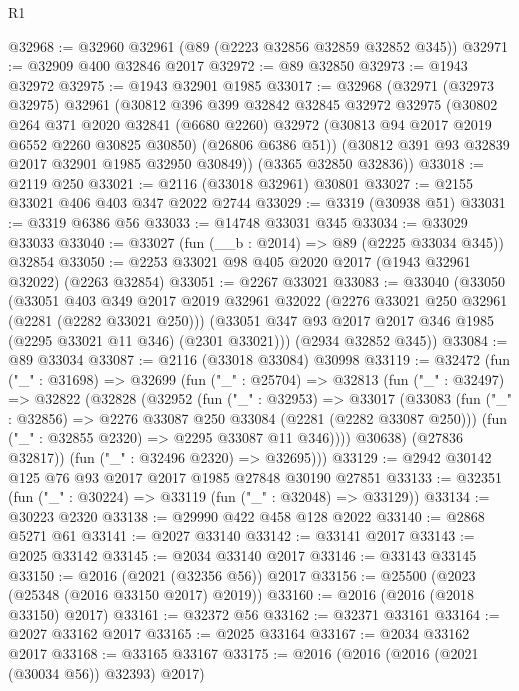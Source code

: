 \begin{lexlean}{R1}
\begin{coremodule}
@32968 := @32960 @32961 (@89 (@2223 @32856 @32859 @32852 @345))
@32971 := @32909 @400 @32846 @2017
@32972 := @89 @32850
@32973 := @1943 @32972
@32975 := @1943 @32901 @1985
@33017 := @32968
    (@32971
      (@32973 @32975)
      @32961
      (@30812
        @396
        @399
        @32842
        @32845
        @32972
        @32975
        (@30802
          @264
          @371
          @2020
          @32841
          (@6680 @2260)
          @32972
          (@30813 @94 @2017 @2019 @6552 @2260 @30825 @30850)
          (@26806 @6386 @51))
        (@30812 @391 @93 @32839 @2017 @32901 @1985 @32950 @30849))
      (@3365 @32850 @32836))
@33018 := @2119 @250
@33021 := @2116 (@33018 @32961) @30801
@33027 := @2155 @33021 @406 @403 @347 @2022 @2744
@33029 := @3319 (@30938 @51)
@33031 := @3319 @6386 @56
@33033 := @14748 @33031 @345
@33034 := @33029 @33033
@33040 := @33027 (fun (__b : @2014) => @89 (@2225 @33034 @345)) @32854
@33050 := @2253 @33021 @98 @405 @2020 @2017 (@1943 @32961 @32022) (@2263 @32854)
@33051 := @2267 @33021
@33083 := @33040
    (@33050
      (@33051
        @403
        @349
        @2017
        @2019
        @32961
        @32022
        (@2276 @33021 @250 @32961 (@2281 (@2282 @33021 @250)))
        (@33051 @347 @93 @2017 @2017 @346 @1985 (@2295 @33021 @11 @346) (@2301 @33021)))
      (@2934 @32852 @345))
@33084 := @89 @33034
@33087 := @2116 (@33018 @33084) @30998
@33119 := @32472
    (fun ("_" : @31698) =>
    @32699
      (fun ("_" : @25704) =>
      @32813
        (fun ("_" : @32497) =>
        @32822
          (@32828
            (@32952
              (fun ("_" : @32953) =>
              @33017
                (@33083
                  (fun ("_" : @32856) => @2276 @33087 @250 @33084 (@2281 (@2282 @33087 @250)))
                  (fun ("_" : @32855 @2320) => @2295 @33087 @11 @346))))
            @30638)
          (@27836 @32817))
        (fun ("_" : @32496 @2320) => @32695)))
@33129 := @2942 @30142 @125 @76 @93 @2017 @2017 @1985 @27848 @30190 @27851
@33133 := @32351 (fun ("_" : @30224) => @33119 (fun ("_" : @32048) => @33129))
@33134 := @30223 @2320
@33138 := @29990 @422 @458 @128 @2022
@33140 := @2868 @5271 @61
@33141 := @2027 @33140
@33142 := @33141 @2017
@33143 := @2025 @33142
@33145 := @2034 @33140 @2017
@33146 := @33143 @33145
@33150 := @2016 (@2021 (@32356 @56)) @2017
@33156 := @25500 (@2023 (@25348 (@2016 @33150 @2017) @2019))
@33160 := @2016 (@2016 (@2018 @33150) @2017)
@33161 := @32372 @56
@33162 := @32371 @33161
@33164 := @2027 @33162 @2017
@33165 := @2025 @33164
@33167 := @2034 @33162 @2017
@33168 := @33165 @33167
@33175 := @2016 (@2016 (@2016 (@2021 (@30034 @56)) @32393) @2017)

\end{coremodule}
\end{lexlean}
